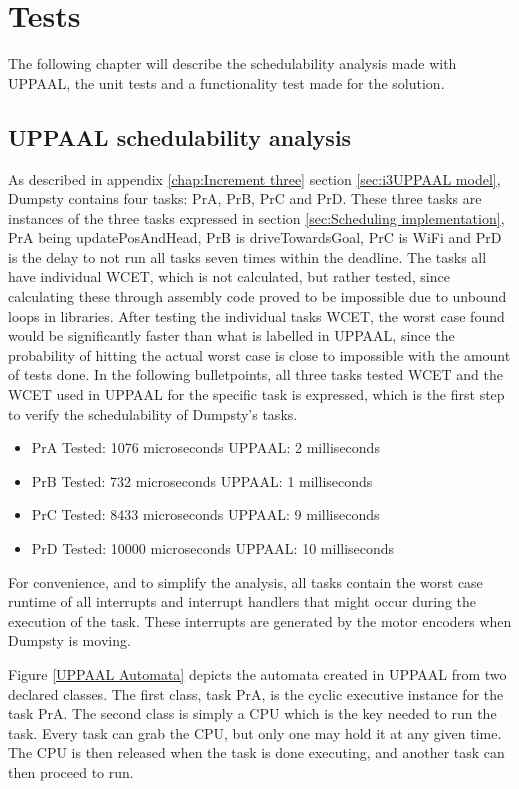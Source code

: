\chapter{Tests}
\label{chap:Tests}
The following chapter will describe the schedulability analysis made with UPPAAL, the unit tests and a functionality test made for the solution. 

\section{UPPAAL schedulability analysis}
\label{sec:UPPAAL schedulability}
As described in appendix \ref{chap:Increment three} section  \ref{sec:i3UPPAAL model}, Dumpsty contains four tasks: PrA, PrB, PrC and PrD. These three tasks are instances of the three tasks expressed in section \ref{sec:Scheduling implementation}, PrA being updatePosAndHead, PrB is driveTowardsGoal, PrC is WiFi and PrD is the delay to not run all tasks seven times within the deadline.
The tasks all have individual WCET, which is not calculated, but rather tested, since calculating these through assembly code proved to be impossible due to unbound loops in libraries. After testing the individual tasks WCET, the worst case found would be significantly faster than what is labelled in UPPAAL, since the probability of hitting the actual worst case is close to impossible with the amount of tests done. In the following bulletpoints, all three tasks tested WCET and the WCET used in UPPAAL for the specific task is expressed, which is the first step to verify the schedulability of Dumpsty's tasks.


\begin{itemize}
	\item PrA \tab Tested: 1076 microseconds \tab UPPAAL: 2 milliseconds
	\item PrB \tab Tested: 732  microseconds \tab UPPAAL: 1 milliseconds
	\item PrC \tab Tested: 8433 microseconds \tab UPPAAL: 9 milliseconds
	\item PrD \tab Tested: 10000 microseconds \tab UPPAAL: 10 milliseconds
\end{itemize}


For convenience, and to simplify the analysis, all tasks contain the worst case runtime of all interrupts and interrupt handlers that might occur during the execution of the task. These interrupts are generated by the motor encoders when Dumpsty is moving.


Figure \ref{UPPAAL Automata} depicts the automata created in UPPAAL from two declared classes. The first class, task PrA, is the cyclic executive instance for the task PrA. The second class is simply a CPU which is the key needed to run the task. Every task can grab the CPU, but only one may hold it at any given time. The CPU is then released when the task is done executing, and another task can then proceed to run.


